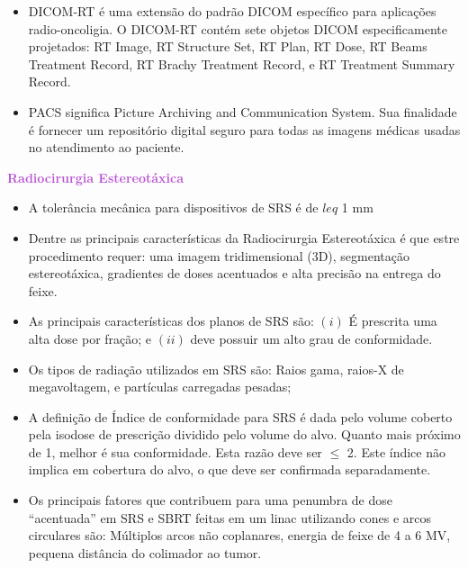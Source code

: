 \documentclass[11pt,a4paper]{article}
\newcounter{exemplo}
\begin{document}
\begin{exemplo}
\begin{itemize}
        \item DICOM-RT é uma extensão do padrão DICOM específico para aplicações radio-oncoligia. O DICOM-RT contém sete objetos DICOM especificamente projetados: RT Image, RT Structure Set, RT Plan, RT Dose, RT Beams Treatment Record, RT Brachy Treatment Record, e RT Treatment Summary Record.
        
        \item PACS significa Picture Archiving and Communication System. Sua finalidade é fornecer um repositório digital seguro para todas as imagens médicas usadas no atendimento ao paciente.

    \end{itemize}

\end{exemplo}

\begin{exemplo}

    \textcolor{MediumOrchid}{\LobsterTwo\textbf{Radiocirurgia Estereotáxica}}
    \begin{itemize}
        \item A tolerância mecânica para dispositivos de SRS é de $leq$ 1 mm
        
        \item Dentre as principais características da Radiocirurgia Estereotáxica é que estre procedimento requer: uma imagem tridimensional (3D), segmentação estereotáxica, gradientes de doses acentuados e alta precisão na entrega do feixe.
        
        \item As principais características dos planos de SRS são: $(i)$ É prescrita uma alta dose por fração; e $(ii)$ deve possuir um alto grau de conformidade.
        
        \item Os tipos de radiação utilizados em SRS são: Raios gama, raios-X de megavoltagem, e partículas carregadas pesadas;
        
        \item A definição de Índice de conformidade para SRS é dada pelo volume coberto pela isodose de prescrição dividido pelo volume do alvo. Quanto mais próximo de 1, melhor é sua conformidade. Esta razão deve ser $\leq$ 2. Este índice não implica em cobertura do alvo, o que deve ser confirmada separadamente. 
        
        \item Os principais fatores que contribuem para uma penumbra de dose ``acentuada'' em SRS e SBRT feitas em um linac utilizando cones e arcos circulares são: Múltiplos arcos não coplanares, energia de feixe de 4 a 6 MV, pequena distância do colimador ao tumor.
        

\end{itemize}
\end{exemplo}
\end{document}
